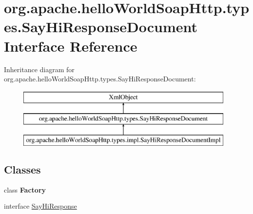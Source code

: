 \hypertarget{interfaceorg_1_1apache_1_1hello_world_soap_http_1_1types_1_1_say_hi_response_document}{}\section{org.\+apache.\+hello\+World\+Soap\+Http.\+types.\+Say\+Hi\+Response\+Document Interface Reference}
\label{interfaceorg_1_1apache_1_1hello_world_soap_http_1_1types_1_1_say_hi_response_document}
Inheritance diagram for org.\+apache.\+hello\+World\+Soap\+Http.\+types.\+Say\+Hi\+Response\+Document\+:\begin{figure}[H]
\begin{center}
\leavevmode
\includegraphics[height=3.000000cm]{interfaceorg_1_1apache_1_1hello_world_soap_http_1_1types_1_1_say_hi_response_document}
\end{center}
\end{figure}
\subsection*{Classes}
\begin{DoxyCompactItemize}
\item 
class {\bfseries Factory}
\item 
interface \hyperlink{interfaceorg_1_1apache_1_1hello_world_soap_http_1_1types_1_1_say_hi_response_document_1_1_say_hi_response}{Say\+Hi\+Response}
\end{DoxyCompactItemize}
